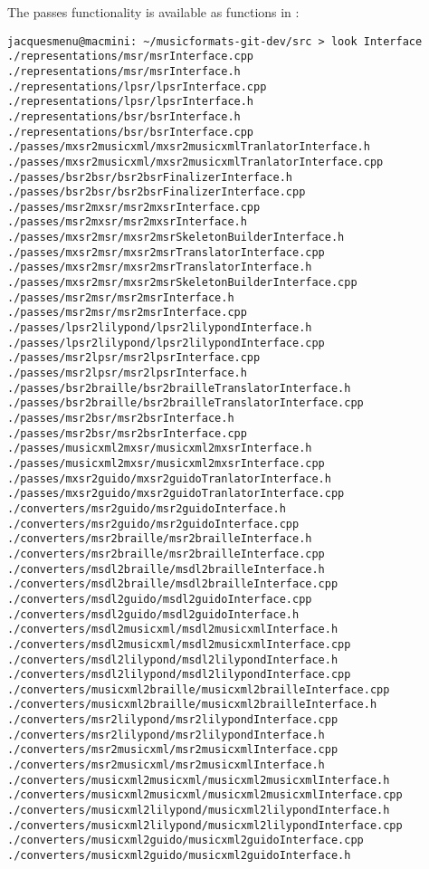 The passes functionality is available as functions in :
\begin{lstlisting}[language=Terminal]
jacquesmenu@macmini: ~/musicformats-git-dev/src > look Interface
./representations/msr/msrInterface.cpp
./representations/msr/msrInterface.h
./representations/lpsr/lpsrInterface.cpp
./representations/lpsr/lpsrInterface.h
./representations/bsr/bsrInterface.h
./representations/bsr/bsrInterface.cpp
./passes/mxsr2musicxml/mxsr2musicxmlTranlatorInterface.h
./passes/mxsr2musicxml/mxsr2musicxmlTranlatorInterface.cpp
./passes/bsr2bsr/bsr2bsrFinalizerInterface.h
./passes/bsr2bsr/bsr2bsrFinalizerInterface.cpp
./passes/msr2mxsr/msr2mxsrInterface.cpp
./passes/msr2mxsr/msr2mxsrInterface.h
./passes/mxsr2msr/mxsr2msrSkeletonBuilderInterface.h
./passes/mxsr2msr/mxsr2msrTranslatorInterface.cpp
./passes/mxsr2msr/mxsr2msrTranslatorInterface.h
./passes/mxsr2msr/mxsr2msrSkeletonBuilderInterface.cpp
./passes/msr2msr/msr2msrInterface.h
./passes/msr2msr/msr2msrInterface.cpp
./passes/lpsr2lilypond/lpsr2lilypondInterface.h
./passes/lpsr2lilypond/lpsr2lilypondInterface.cpp
./passes/msr2lpsr/msr2lpsrInterface.cpp
./passes/msr2lpsr/msr2lpsrInterface.h
./passes/bsr2braille/bsr2brailleTranslatorInterface.h
./passes/bsr2braille/bsr2brailleTranslatorInterface.cpp
./passes/msr2bsr/msr2bsrInterface.h
./passes/msr2bsr/msr2bsrInterface.cpp
./passes/musicxml2mxsr/musicxml2mxsrInterface.h
./passes/musicxml2mxsr/musicxml2mxsrInterface.cpp
./passes/mxsr2guido/mxsr2guidoTranlatorInterface.h
./passes/mxsr2guido/mxsr2guidoTranlatorInterface.cpp
./converters/msr2guido/msr2guidoInterface.h
./converters/msr2guido/msr2guidoInterface.cpp
./converters/msr2braille/msr2brailleInterface.h
./converters/msr2braille/msr2brailleInterface.cpp
./converters/msdl2braille/msdl2brailleInterface.h
./converters/msdl2braille/msdl2brailleInterface.cpp
./converters/msdl2guido/msdl2guidoInterface.cpp
./converters/msdl2guido/msdl2guidoInterface.h
./converters/msdl2musicxml/msdl2musicxmlInterface.h
./converters/msdl2musicxml/msdl2musicxmlInterface.cpp
./converters/msdl2lilypond/msdl2lilypondInterface.h
./converters/msdl2lilypond/msdl2lilypondInterface.cpp
./converters/musicxml2braille/musicxml2brailleInterface.cpp
./converters/musicxml2braille/musicxml2brailleInterface.h
./converters/msr2lilypond/msr2lilypondInterface.cpp
./converters/msr2lilypond/msr2lilypondInterface.h
./converters/msr2musicxml/msr2musicxmlInterface.cpp
./converters/msr2musicxml/msr2musicxmlInterface.h
./converters/musicxml2musicxml/musicxml2musicxmlInterface.h
./converters/musicxml2musicxml/musicxml2musicxmlInterface.cpp
./converters/musicxml2lilypond/musicxml2lilypondInterface.h
./converters/musicxml2lilypond/musicxml2lilypondInterface.cpp
./converters/musicxml2guido/musicxml2guidoInterface.cpp
./converters/musicxml2guido/musicxml2guidoInterface.h
\end{lstlisting}


